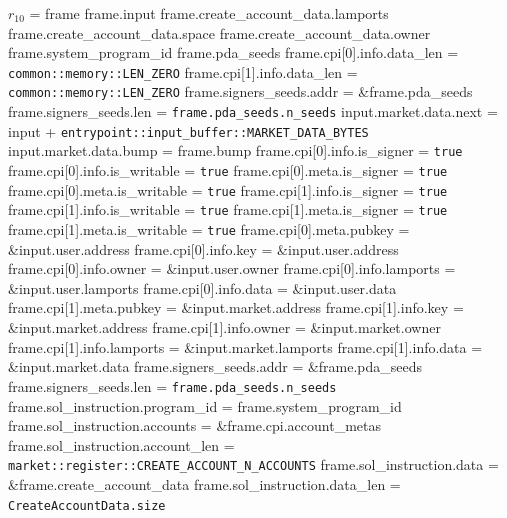\begin{algorithm}
\caption{CREATE-MARKET-ACCOUNT}
\begin{algorithmic}
  \INPUT $r_{10}$ = frame
  \REQUIRE frame.input
  \REQUIRE frame.create\_account\_data.lamports
  \REQUIRE frame.create\_account\_data.space
  \REQUIRE frame.create\_account\_data.owner
  \REQUIRE frame.system\_program\_id
  \REQUIRE frame.pda\_seeds
  \REQUIRE frame.cpi[0].info.data\_len = \texttt{common::memory::LEN\_ZERO}
  \REQUIRE frame.cpi[1].info.data\_len = \texttt{common::memory::LEN\_ZERO}
  \ENSURE frame.signers\_seeds.addr = \&frame.pda\_seeds
  \ENSURE frame.signers\_seeds.len = \texttt{frame.pda\_seeds.n\_seeds}
  \ENSURE input.market.data.next = input + \texttt{entrypoint::input\_buffer::MARKET\_DATA\_BYTES}
  \ENSURE input.market.data.bump = frame.bump
  \STATE frame.cpi[0].info.is\_signer = \texttt{true}
  \STATE frame.cpi[0].info.is\_writable = \texttt{true}
  \STATE frame.cpi[0].meta.is\_signer = \texttt{true}
  \STATE frame.cpi[0].meta.is\_writable = \texttt{true}
  \STATE frame.cpi[1].info.is\_signer = \texttt{true}
  \STATE frame.cpi[1].info.is\_writable = \texttt{true}
  \STATE frame.cpi[1].meta.is\_signer = \texttt{true}
  \STATE frame.cpi[1].meta.is\_writable = \texttt{true}
  \STATE frame.cpi[0].meta.pubkey = \&input.user.address
  \STATE frame.cpi[0].info.key = \&input.user.address
  \STATE frame.cpi[0].info.owner = \&input.user.owner
  \STATE frame.cpi[0].info.lamports = \&input.user.lamports
  \STATE frame.cpi[0].info.data = \&input.user.data
  \STATE frame.cpi[1].meta.pubkey = \&input.market.address
  \STATE frame.cpi[1].info.key = \&input.market.address
  \STATE frame.cpi[1].info.owner = \&input.market.owner
  \STATE frame.cpi[1].info.lamports = \&input.market.lamports
  \STATE frame.cpi[1].info.data = \&input.market.data
  \STATE frame.signers\_seeds.addr = \&frame.pda\_seeds
  \STATE frame.signers\_seeds.len = \texttt{frame.pda\_seeds.n\_seeds}
  \STATE frame.sol\_instruction.program\_id = frame.system\_program\_id
  \STATE frame.sol\_instruction.accounts = \&frame.cpi.account\_metas
  \STATE frame.sol\_instruction.account\_len =
    \texttt{market::register::CREATE\_ACCOUNT\_N\_ACCOUNTS}
  \STATE frame.sol\_instruction.data = \&frame.create\_account\_data
  \STATE frame.sol\_instruction.data\_len = \texttt{CreateAccountData.size}

\end{algorithmic}
\end{algorithm}
